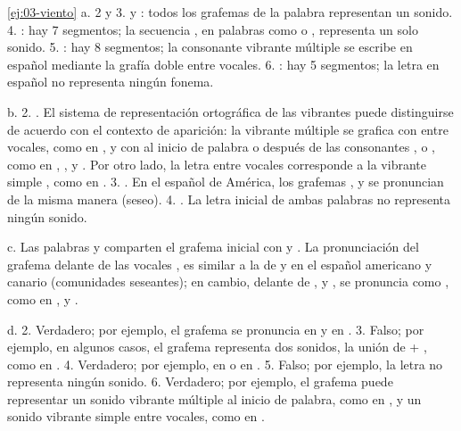 \begin{solucion}{\ref{ej:03-viento}}
a. 2 y 3.  y : todos los grafemas de la palabra representan
un sonido. 4. : hay 7 segmentos; la secuencia , en
palabras como  o , representa un solo sonido. 5.
 : hay 8 segmentos; la consonante vibrante
múltiple  se escribe en español mediante la grafía doble 
entre vocales. 6.  : hay 5 segmentos; la letra
 en español no representa ningún fonema.

b. 2. . El sistema de representación
ortográfica de las vibrantes puede distinguirse de acuerdo con el contexto de
aparición: la vibrante múltiple  se grafica con  entre vocales,
como en , y con  al inicio de palabra o después de las
consonantes ,  o , como en ,
,  y . Por otro lado, la letra
 entre vocales corresponde a la vibrante simple , como en
. 3. . En el español de América, los grafemas
,  y  se pronuncian de la misma manera (seseo). 4.
. La letra inicial de ambas palabras no representa
ningún sonido.

c. Las palabras  y  comparten el grafema inicial con
 y . La pronunciación del grafema 
delante de las vocales ,  es similar a la de  y
 en el español americano y canario (comunidades seseantes); en
cambio, delante de ,  y ,  se pronuncia como
, como en ,  y .

d. 2. Verdadero; por ejemplo, el grafema  se pronuncia  en
 y  en . 3.
Falso; por ejemplo, en algunos casos, el grafema  representa dos
sonidos, la unión de  + , como en . 4. Verdadero; por
ejemplo,  en  o  en . 5. Falso;
por ejemplo, la letra  no representa ningún sonido. 6. Verdadero; por
ejemplo, el grafema  puede representar un sonido vibrante múltiple al
inicio de palabra, como en , y un sonido vibrante simple entre
vocales, como en .


\end{solucion}
